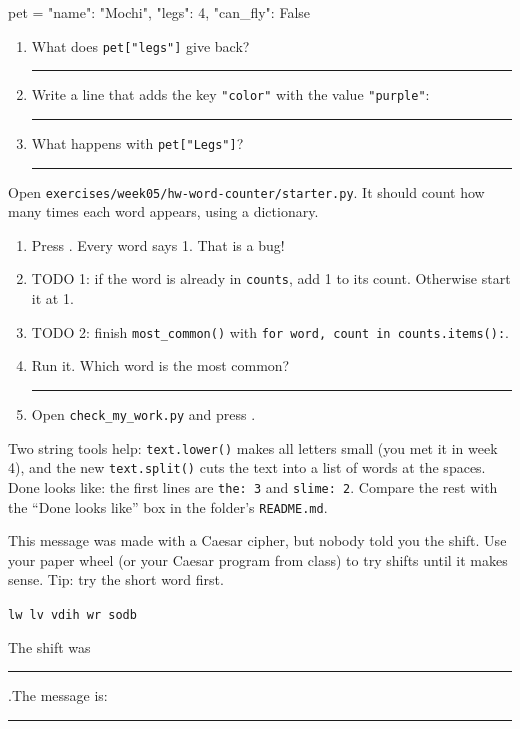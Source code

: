 \namedateline

\begin{core}
\begin{pycode}
pet = {"name": "Mochi", "legs": 4, "can_fly": False}
\end{pycode}
\begin{enumerate}[leftmargin=1.4em,itemsep=6pt]
  \item What does \texttt{pet["legs"]} give back?\quad \rule{4cm}{0.4pt}
  \item Write a line that adds the key \texttt{"color"} with the value \texttt{"purple"}:\par \rule{8cm}{0.4pt}
  \item What happens with \texttt{pet["Legs"]}?\quad \rule{6cm}{0.4pt}
\end{enumerate}
\end{core}

\begin{core}
Open \texttt{exercises/week05/hw-word-counter/starter.py}. It should count how many times each word appears, using a dictionary.
\begin{enumerate}[leftmargin=1.4em]
  \item Press . Every word says 1. That is a bug!
  \item TODO 1: if the word is already in \texttt{counts}, add 1 to its count. Otherwise start it at 1.
  \item TODO 2: finish \texttt{most\_common()} with \texttt{for word, count in counts.items():}.
  \item Run it. Which word is the most common? \rule{3cm}{0.4pt}
  \item Open \texttt{check\_my\_work.py} and press .
\end{enumerate}
Two string tools help: \texttt{text.lower()} makes all letters small (you met it in week 4), and the new \texttt{text.split()}
cuts the text into a list of words at the spaces.
Done looks like: the first lines are \texttt{the: 3} and \texttt{slime: 2}. Compare the rest with the \enquote{Done looks like} box in the folder's \texttt{README.md}.
\end{core}

\begin{challenge}
This message was made with a Caesar cipher, but nobody told you the shift. Use your paper wheel (or your Caesar program
from class) to try shifts until it makes sense. Tip: try the short word first.
\begin{center}\texttt{lw lv vdih wr sodb}\end{center}
The shift was \rule{1cm}{0.4pt}.\quad The message is: \rule{6cm}{0.4pt}
\end{challenge}

